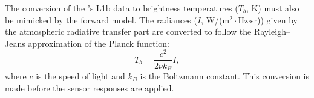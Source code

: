 The conversion of the \smr's L1b data to brightness temperatures ($T_b$, K)
must also be mimicked by the forward model. The radiances ($I$,
W/(m$^2\cdot$Hz$\cdot$sr)) given by the atmospheric radiative transfer part are
converted to follow the Rayleigh--Jeans approximation of the Planck function:
\begin{equation}
  \label{eq:i2tb}
  T_b = \frac{c^2}{2\nu k_B} I,
\end{equation}
where $c$ is the speed of light and $k_B$ is the Boltzmann constant. This
conversion is made before the sensor responses are applied.



%



